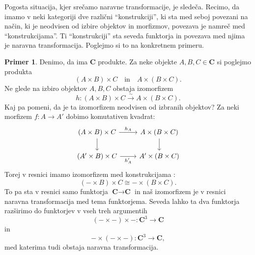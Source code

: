 \documentclass[12pt,a4paper]{book}
\theoremstyle{definition}
\theoremstyle{plain}
\theoremstyle{definition}
\newtheorem{primer}{Primer}[section]
\theoremstyle{remark}
\newcommand{\cat}[1]{\textbf{#1}}
\begin{document}
Pogosta situacija, kjer srečamo naravne transformacije, je sledeča. Recimo, da imamo v neki kategoriji dve različni "`konstrukciji"', ki sta med seboj povezani na način, ki je neodvisen od izbire objektov in morfizmov, povezava je namreč med "`konstrukcijama"'. Ti "`konstrukciji"' sta seveda funktorja in povezava med njima je naravna transformacija. Poglejmo si to na konkretnem primeru.

\begin{primer}
Denimo, da ima $\cat{C}$ produkte. Za neke objekte $A,B,C \in \cat{C}$ si poglejmo produkta
$$(A \times B) \times C \quad \text{in} \quad A \times (B \times C).$$
Ne glede na izbiro objektov $A,B,C$ obstaja izomorfizem
$$h : (A \times B) \times C \xrightarrow{\sim} A \times (B \times C).$$
Kaj pa pomeni, da je ta izomorfizem neodvisen od izbranih objektov? Za neki morfizem $f : A \to A'$ dobimo komutativen kvadrat:
%
$$ \begin{tikzcd}
(A \times B) \times C \ar[r, "h_A"] \ar[d] & A \times (B \times C) \ar[d] \\
(A' \times B) \times C \ar[r, "h_A'"'] & A' \times (B \times C) 
\end{tikzcd} $$
Torej v resnici imamo izomorfizem med konstrukcijama :
$$(- \times B) \times C \cong - \times (B \times C).$$
To pa sta v resnici samo funktorja $\cat{C} \to \cat{C}$ in naš izomorfizem je v resnici naravna transformacija med tema funktorjema. Seveda lahko ta dva funktorja razširimo do funktorjev v vseh treh argumentih
$$(- \times -) \times - : \cat{C}^3 \to \cat{C}$$
in
$$ - \times (- \times -) : \cat{C}^3 \to \cat{C},$$
med katerima tudi obstaja naravna transformacija.
\end{primer}
\end{document}
